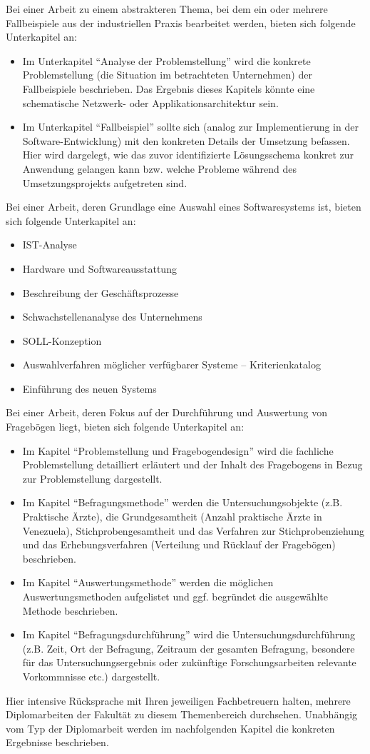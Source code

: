 Bei einer Arbeit zu einem abstrakteren Thema, bei dem ein oder mehrere Fallbeispiele aus der industriellen Praxis bearbeitet werden, bieten sich folgende Unterkapitel an:
\begin{itemize}
	\item Im Unterkapitel \enquote{Analyse der Problemstellung} wird die konkrete Problemstellung (die Situation im betrachteten Unternehmen) der Fallbeispiele beschrieben. Das Ergebnis dieses Kapitels könnte eine schematische Netzwerk- oder Applikationsarchitektur sein.
	\item Im Unterkapitel \enquote{Fallbeispiel} sollte sich (analog zur Implementierung in der Software-Entwicklung) mit den konkreten Details der Umsetzung befassen. Hier wird dargelegt, wie das zuvor identifizierte Lösungsschema konkret zur Anwendung gelangen kann bzw. welche Probleme während des Umsetzungsprojekts aufgetreten sind.
\end{itemize}

Bei einer Arbeit, deren Grundlage eine Auswahl eines Softwaresystems ist, bieten sich folgende Unterkapitel an:
\begin{itemize}
	\item IST-Analyse
	\item Hardware und Softwareausstattung
	\item Beschreibung der Geschäftsprozesse
	\item Schwachstellenanalyse des Unternehmens
	\item SOLL-Konzeption
	\item Auswahlverfahren möglicher verfügbarer Systeme -- Kriterienkatalog
	\item Einführung des neuen Systems
\end{itemize}

Bei einer Arbeit, deren Fokus auf der Durchführung und Auswertung von Fragebögen liegt, bieten sich folgende Unterkapitel an:
\begin{itemize}
	\item Im Kapitel \enquote{Problemstellung und Fragebogendesign} wird die fachliche Problemstellung detailliert erläutert und der Inhalt des Fragebogens in Bezug zur Problemstellung dargestellt.
	\item Im Kapitel \enquote{Befragungsmethode} werden die Untersuchungsobjekte (z.B. Praktische Ärzte), die Grundgesamtheit (Anzahl praktische Ärzte in Venezuela), Stichprobengesamtheit und das Verfahren zur Stichprobenziehung und das Erhebungsverfahren (Verteilung und Rücklauf der Fragebögen) beschrieben.
	\item Im Kapitel \enquote{Auswertungsmethode} werden die möglichen Auswertungsmethoden aufgelistet und ggf. begründet die ausgewählte Methode beschrieben.
	\item Im Kapitel \enquote{Befragungsdurchführung} wird die Untersuchungsdurchführung (z.B. Zeit, Ort der Befragung, Zeitraum der gesamten Befragung, besondere für das Untersuchungsergebnis oder zukünftige Forschungsarbeiten relevante Vorkommnisse etc.) dargestellt.
\end{itemize}

Hier intensive Rücksprache mit Ihren jeweiligen Fachbetreuern halten, mehrere Diplomarbeiten der Fakultät zu diesem Themenbereich durchsehen. Unabhängig vom Typ der Diplomarbeit werden im nachfolgenden Kapitel die konkreten Ergebnisse beschrieben.
\fi\makeatother